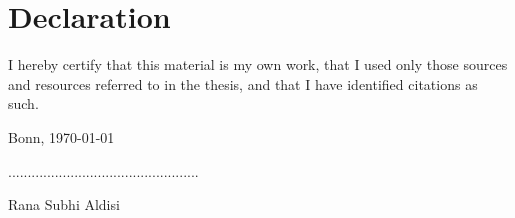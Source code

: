 \chapter*{Declaration}
\noindent I hereby certify that this material is my own work, that I used only those sources and resources referred to in the thesis, and that I have identified citations as such.

\vspace{0.3in}

\noindent Bonn, \today

\vspace{1in}
\noindent .................................................

\noindent Rana Subhi Aldisi